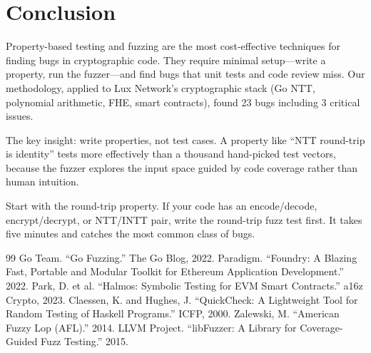 \documentclass[11pt,a4paper]{article}
\begin{document}
\section{Conclusion}

Property-based testing and fuzzing are the most cost-effective techniques for finding
bugs in cryptographic code. They require minimal setup---write a property, run the
fuzzer---and find bugs that unit tests and code review miss. Our methodology, applied to
Lux Network's cryptographic stack (Go NTT, polynomial arithmetic, FHE, smart contracts),
found 23 bugs including 3 critical issues.

The key insight: write properties, not test cases. A property like ``NTT round-trip is
identity'' tests more effectively than a thousand hand-picked test vectors, because the
fuzzer explores the input space guided by code coverage rather than human intuition.

Start with the round-trip property. If your code has an encode/decode, encrypt/decrypt,
or NTT/INTT pair, write the round-trip fuzz test first. It takes five minutes and catches
the most common class of bugs.

\begin{thebibliography}{99}
 Go Team. ``Go Fuzzing.'' The Go Blog, 2022.
 Paradigm. ``Foundry: A Blazing Fast, Portable and Modular Toolkit for Ethereum Application Development.'' 2022.
 Park, D. et al. ``Halmos: Symbolic Testing for EVM Smart Contracts.'' a16z Crypto, 2023.
 Claessen, K. and Hughes, J. ``QuickCheck: A Lightweight Tool for Random Testing of Haskell Programs.'' ICFP, 2000.
 Zalewski, M. ``American Fuzzy Lop (AFL).'' 2014.
 LLVM Project. ``libFuzzer: A Library for Coverage-Guided Fuzz Testing.'' 2015.
\end{thebibliography}
\end{document}
